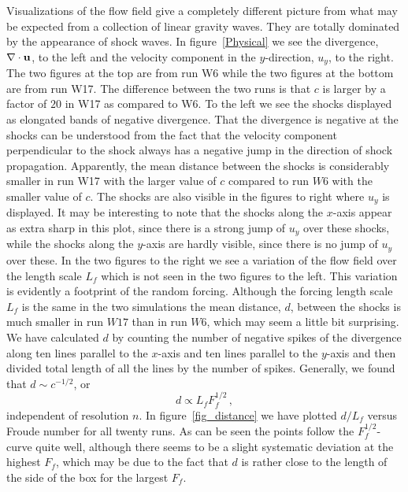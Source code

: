 Visualizations of the flow field give a completely different picture from what
may be expected from a collection of linear gravity waves. They are totally
dominated by the appearance of shock waves. In figure~\ref{Physical} we see
the divergence, $ \nabla \cdot {\bf u} $, to the left and the velocity
component in the $ y $-direction, $ u_y $, to the right. The two figures at the
top are from run W6 while the two figures at the bottom are from run W17. The
difference between the two runs is that $ c $ is larger by a factor of $ 20 $
in W17 as compared to W6. To the left we see the shocks displayed as elongated
bands of negative divergence. That the divergence is negative at the shocks can
be understood from the fact that the velocity component perpendicular to the
shock always has a negative jump in the direction of shock propagation.
Apparently, the mean distance between the shocks is considerably smaller in run
W17 with the larger value of $ c $ compared to run $ W6 $ with the smaller
value of $ c $. The shocks are also visible in the figures to right where $ u_y
$ is displayed. It may be interesting to note that the shocks along the $ x
$-axis appear as extra sharp in this plot, since there is a strong jump of $
u_{y} $ over these shocks, while the shocks along the $ y $-axis are hardly
visible, since there is no jump of $ u_{y} $ over these. In the two figures to
the right we see a variation of the flow field over the length scale $ L_f $
which is not seen in the two figures to the left. This variation is evidently a
footprint of the random forcing. Although the forcing length scale $ L_f $ is
the same in the two simulations the mean distance, $ d $, between the shocks is
much smaller in run $ W17 $ than in run $ W6 $, which may seem a little bit
surprising. We have calculated $ d $ by counting the number of negative spikes
of the divergence along ten lines parallel to the $ x $-axis and ten lines
parallel to the $ y $-axis and then divided total length of all the lines by
the number of spikes. Generally, we found that $ d \sim c^{-1/2} $, or
\begin{equation} \label{MeanDistance}
d \propto L_f F_f ^{1/2} \, ,
\end{equation}
independent of resolution $ n $. In figure~\ref{fig_distance} we have plotted
$ d/L_f $ versus Froude number for all twenty runs. As can be seen the points
follow the $ F_f^{1/2} $-curve quite well, although there seems to be a slight
systematic deviation at the highest $ F_f $, which may be due to the fact that
$ d $ is rather close to the length of the side of the box for the largest $
F_f $.


